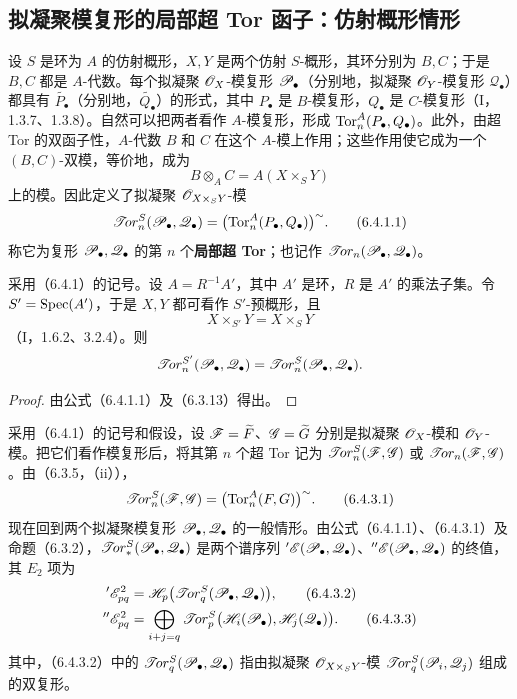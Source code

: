 \subsection{拟凝聚模复形的局部超 Tor 函子：仿射概形情形}
设 $S$ 是环为 $A$ 的仿射概形，$X,Y$ 是两个仿射 $S$-概形，其环分别为 $B,C$；于是 $B,C$ 都是 $A$-代数。每个拟凝聚 $\mathscr O_X$-模复形 $\mathscr P_\bullet$（分别地，拟凝聚 $\mathscr O_Y$-模复形 $\mathscr Q_\bullet$）都具有 $\widetilde{P_\bullet}$（分别地，$\widetilde{Q_\bullet}$）的形式，其中 $P_\bullet$ 是 $B$-模复形，$Q_\bullet$ 是 $C$-模复形（I，1.3.7、1.3.8）。自然可以把两者看作 $A$-模复形，形成 $\operatorname{Tor}_n^A(P_\bullet,Q_\bullet)$。此外，由超 Tor 的双函子性，$A$-代数 $B$ 和 $C$ 在这个 $A$-模上作用；这些作用使它成为一个 $(B,C)$-双模，等价地，成为
\[
 B\otimes_A C=A(X\times_S Y)
\]
上的模。因此定义了拟凝聚 $\mathscr O_{X\times_S Y}$-模
\begin{equation}
 \mathscr{T}\!or_n^S(\mathscr P_\bullet,\mathscr Q_\bullet)
 =\bigl(\operatorname{Tor}_n^A(P_\bullet,Q_\bullet)\bigr)^{\sim}.
 \tag{6.4.1.1}
\end{equation}
称它为复形 $\mathscr P_\bullet,\mathscr Q_\bullet$ 的第 $n$ 个\textbf{局部超 Tor}；也记作 $\mathscr{T}\!or_n(\mathscr P_\bullet,\mathscr Q_\bullet)$。

采用（6.4.1）的记号。设 $A=R^{-1}A'$，其中 $A'$ 是环，$R$ 是 $A'$ 的乘法子集。令 $S'=\operatorname{Spec}(A')$，于是 $X,Y$ 都可看作 $S'$-预概形，且
\[
 X\times_{S'}Y=X\times_S Y
\]
（I，1.6.2、3.2.4）。则
\[
 \mathscr{T}\!or_n^{S'}(\mathscr P_\bullet,\mathscr Q_\bullet)
 =\mathscr{T}\!or_n^S(\mathscr P_\bullet,\mathscr Q_\bullet).
\]
\begin{proof}
由公式（6.4.1.1）及（6.3.13）得出。
\end{proof}

采用（6.4.1）的记号和假设，设 $\mathscr F=\widetilde F$、$\mathscr G=\widetilde G$ 分别是拟凝聚 $\mathscr O_X$-模和 $\mathscr O_Y$-模。把它们看作模复形后，将其第 $n$ 个超 Tor 记为 $\mathscr{T}\!or_n^S(\mathscr F,\mathscr G)$ 或 $\mathscr{T}\!or_n(\mathscr F,\mathscr G)$。由（6.3.5，（ii）），
\begin{equation}
 \mathscr{T}\!or_n^S(\mathscr F,\mathscr G)=\bigl(\operatorname{Tor}_n^A(F,G)\bigr)^{\sim}.
 \tag{6.4.3.1}
\end{equation}
现在回到两个拟凝聚模复形 $\mathscr P_\bullet,\mathscr Q_\bullet$ 的一般情形。由公式（6.4.1.1）、（6.4.3.1）及命题（6.3.2），$\mathscr{T}\!or_*^S(\mathscr P_\bullet,\mathscr Q_\bullet)$ 是两个谱序列 ${}'\mathscr E(\mathscr P_\bullet,\mathscr Q_\bullet)$、${}''\mathscr E(\mathscr P_\bullet,\mathscr Q_\bullet)$ 的终值，其 $E_2$ 项为
\begin{align}
 {}'\mathscr E^2_{pq}
 &=\mathscr H_p\bigl(\mathscr{T}\!or_q^S(\mathscr P_\bullet,\mathscr Q_\bullet)\bigr),
 \tag{6.4.3.2}\\
 {}''\mathscr E^2_{pq}
 &=\bigoplus_{i+j=q}\mathscr{T}\!or_p^S\bigl(\mathscr H_i(\mathscr P_\bullet),
                         \mathscr H_j(\mathscr Q_\bullet)\bigr).
 \tag{6.4.3.3}
\end{align}
其中，（6.4.3.2）中的 $\mathscr{T}\!or_q^S(\mathscr P_\bullet,\mathscr Q_\bullet)$ 指由拟凝聚 $\mathscr O_{X\times_S Y}$-模 $\mathscr{T}\!or_q^S(\mathscr P_i,\mathscr Q_j)$ 组成的双复形。

